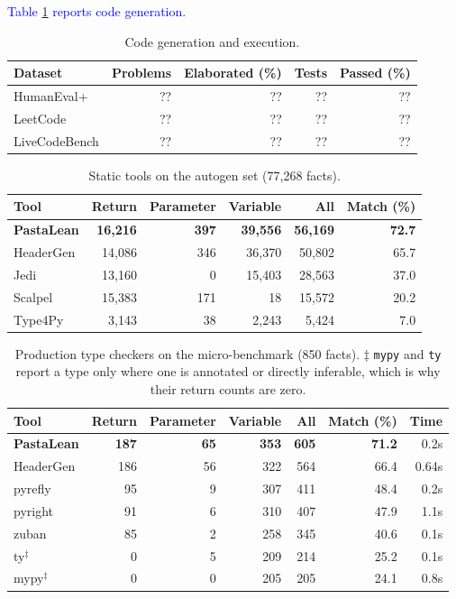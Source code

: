 \documentclass{article}
\newcommand{\suggest}[1]{\textcolor{blue}{#1}}
\begin{document}
\suggest{Table \ref{tab:codegen} reports code generation. }

\begin{table}[t]
\centering
\begin{tabular}{@{}lrrrr@{}}
\toprule
Dataset & Problems & Elaborated (\%) & Tests & Passed (\%) \\
\midrule
HumanEval+     & ?? & ?? & ?? & ?? \\
LeetCode       & ?? & ?? & ?? & ?? \\
LiveCodeBench  & ?? & ?? & ?? & ?? \\
\bottomrule
\end{tabular}
\caption{Code generation and execution.}
\label{tab:codegen}
\end{table}


\begin{table}[t]
\centering
\begin{tabular}{@{}lrrrrr@{}}
\toprule
Tool & Return & Parameter & Variable & All & Match (\%) \\
\midrule
\textbf{PastaLean} & \textbf{16{,}216} & \textbf{397} & \textbf{39{,}556} & \textbf{56{,}169} & \textbf{72.7} \\
HeaderGen          & 14{,}086 & 346 & 36{,}370 & 50{,}802 & 65.7 \\
Jedi               & 13{,}160 & 0   & 15{,}403 & 28{,}563 & 37.0 \\
Scalpel            & 15{,}383 & 171 & 18       & 15{,}572 & 20.2 \\
Type4Py            & 3{,}143  & 38  & 2{,}243  & 5{,}424  & 7.0 \\
\bottomrule
\end{tabular}
\caption{Static tools on the autogen set (77{,}268 facts).}
\label{tab:static-auto}
\end{table}

\begin{table}[t]
\centering
\begin{tabular}{@{}lrrrrrr@{}}
\toprule
Tool & Return & Parameter & Variable & All & Match (\%) & Time \\
\midrule
\textbf{PastaLean} & \textbf{187} & \textbf{65} & \textbf{353} & \textbf{605} & \textbf{71.2} & 0.2s \\
HeaderGen          & 186 & 56 & 322 & 564 & 66.4 & 0.64s \\
pyrefly            & 95 & 9 & 307 & 411 & 48.4 & 0.2s \\
pyright            & 91 & 6 & 310 & 407 & 47.9 & 1.1s \\
zuban              & 85 & 2 & 258 & 345 & 40.6 & 0.1s \\
ty$^\ddagger$      & 0  & 5 & 209 & 214 & 25.2 & 0.1s \\
mypy$^\ddagger$    & 0  & 0 & 205 & 205 & 24.1 & 0.8s \\
\bottomrule
\end{tabular}
\caption{Production type checkers on the micro-benchmark (850 facts). $\ddagger$ \texttt{mypy} and \texttt{ty} report a type only where one is annotated or directly inferable, which is why their return counts are zero.}
\label{tab:checkers-micro}
\end{table}
\end{document}
